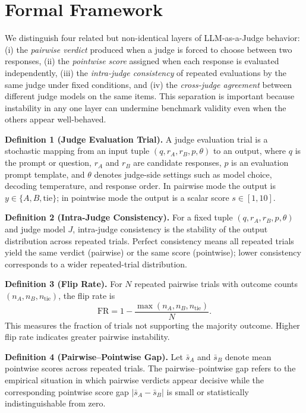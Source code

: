 \documentclass{ijclclp}
\begin{document}
\section{Formal Framework}

We distinguish four related but non-identical layers of LLM-as-a-Judge behavior: (i) the \emph{pairwise verdict} produced when a judge is forced to choose between two responses, (ii) the \emph{pointwise score} assigned when each response is evaluated independently, (iii) the \emph{intra-judge consistency} of repeated evaluations by the same judge under fixed conditions, and (iv) the \emph{cross-judge agreement} between different judge models on the same items. This separation is important because instability in any one layer can undermine benchmark validity even when the others appear well-behaved.

\textbf{Definition 1 (Judge Evaluation Trial).} A judge evaluation trial is a stochastic mapping from an input tuple $(q, r_A, r_B, p, \theta)$ to an output, where $q$ is the prompt or question, $r_A$ and $r_B$ are candidate responses, $p$ is an evaluation prompt template, and $\theta$ denotes judge-side settings such as model choice, decoding temperature, and response order. In pairwise mode the output is $y \in \{A, B, \mathrm{tie}\}$; in pointwise mode the output is a scalar score $s \in [1,10]$.

\textbf{Definition 2 (Intra-Judge Consistency).} For a fixed tuple $(q, r_A, r_B, p, \theta)$ and judge model $J$, intra-judge consistency is the stability of the output distribution across repeated trials. Perfect consistency means all repeated trials yield the same verdict (pairwise) or the same score (pointwise); lower consistency corresponds to a wider repeated-trial distribution.

\textbf{Definition 3 (Flip Rate).} For $N$ repeated pairwise trials with outcome counts $(n_A, n_B, n_{\mathrm{tie}})$, the flip rate is
\begin{equation}
    \mathrm{FR} = 1 - \frac{\max(n_A, n_B, n_{\mathrm{tie}})}{N}.
\end{equation}
This measures the fraction of trials not supporting the majority outcome. Higher flip rate indicates greater pairwise instability.

\textbf{Definition 4 (Pairwise--Pointwise Gap).} Let $\bar{s}_A$ and $\bar{s}_B$ denote mean pointwise scores across repeated trials. The pairwise--pointwise gap refers to the empirical situation in which pairwise verdicts appear decisive while the corresponding pointwise score gap $|\bar{s}_A - \bar{s}_B|$ is small or statistically indistinguishable from zero.
\end{document}

